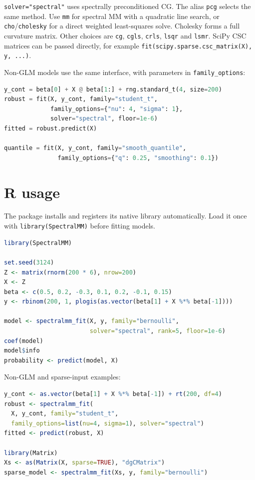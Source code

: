 \documentclass[10pt,a4paper]{article}
\begin{document}
\texttt{solver="spectral"} uses spectrally preconditioned CG. The alias \texttt{pcg} selects the same method.
Use \texttt{mm} for spectral MM with a quadratic line search, or
\texttt{cho}/\texttt{cholesky} for a direct weighted least-squares solve.
Cholesky forms a full curvature matrix. Other choices are
\texttt{cg}, \texttt{cgls}, \texttt{crls}, \texttt{lsqr} and \texttt{lsmr}.
SciPy CSC matrices can be passed directly, for example
\texttt{fit(scipy.sparse.csc\_matrix(X), y, ...)}.

Non-GLM models use the same interface, with parameters in \texttt{family\_options}:

\begin{lstlisting}[language=Python]
y_cont = beta[0] + X @ beta[1:] + rng.standard_t(4, size=200)
robust = fit(X, y_cont, family="student_t",
             family_options={"nu": 4, "sigma": 1},
             solver="spectral", floor=1e-6)
fitted = robust.predict(X)

quantile = fit(X, y_cont, family="smooth_quantile",
               family_options={"q": 0.25, "smoothing": 0.1})
\end{lstlisting}

\section{R usage}
The package installs and registers its native library automatically. Load it once
with \texttt{library(SpectralMM)} before fitting models.

\begin{lstlisting}[language=R]
library(SpectralMM)

set.seed(3124)
Z <- matrix(rnorm(200 * 6), nrow=200)
X <- Z
beta <- c(0.5, 0.2, -0.3, 0.1, 0.2, -0.1, 0.15)
y <- rbinom(200, 1, plogis(as.vector(beta[1] + X %*% beta[-1])))

model <- spectralmm_fit(X, y, family="bernoulli",
                        solver="spectral", rank=5, floor=1e-6)
coef(model)
model$info
probability <- predict(model, X)
\end{lstlisting}

Non-GLM and sparse-input examples:

\begin{lstlisting}[language=R]
y_cont <- as.vector(beta[1] + X %*% beta[-1]) + rt(200, df=4)
robust <- spectralmm_fit(
  X, y_cont, family="student_t",
  family_options=list(nu=4, sigma=1), solver="spectral")
fitted <- predict(robust, X)

library(Matrix)
Xs <- as(Matrix(X, sparse=TRUE), "dgCMatrix")
sparse_model <- spectralmm_fit(Xs, y, family="bernoulli")
\end{lstlisting}
\end{document}
